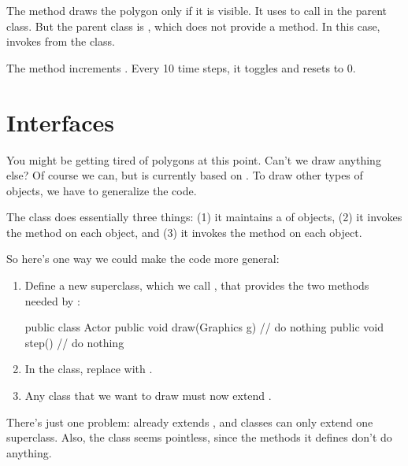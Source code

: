 The  method draws the polygon only if it is visible.
It uses  to call  in the parent class.
But the parent class is , which does not provide a  method.
In this case,  invokes  from the  class.

The  method increments .
Every 10 time steps, it toggles  and resets  to 0.


\section{Interfaces}

You might be getting tired of polygons at this point.
Can't we draw anything else?
Of course we can, but  is currently based on .
To draw other types of objects, we have to generalize the code.

The  class does essentially three things: (1) it maintains a  of objects, (2) it invokes the  method on each object, and (3) it invokes the  method on each object.

So here's one way we could make the code more general:

\begin{enumerate}

\item Define a new superclass, which we call , that provides the two methods needed by :

\begin{code}
public class Actor {
    public void draw(Graphics g) {
        // do nothing
    }
    public void step() {
        // do nothing
    }
}
\end{code}

\item In the  class, replace  with .

\item Any class that we want to draw must now extend .

\end{enumerate}

There's just one problem:  already extends , and classes can only extend one superclass.
Also, the  class seems pointless, since the methods it defines don't do anything.

